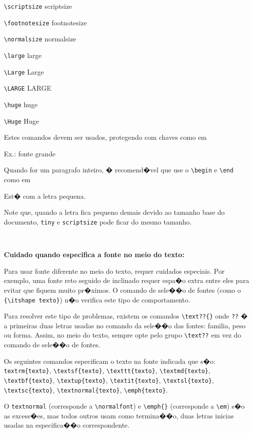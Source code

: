 \documentclass[12pt,a4paper]{article}
\begin{document}
\verb|\scriptsize| {\scriptsize scriptsize}

\verb|\footnotesize| {\footnotesize footnotesize}

\verb|\normalsize| {\normalsize normalsize}

\verb|\large| {\large large}

\verb|\Large| {\Large Large}

\verb|\LARGE| {\LARGE LARGE}

\verb|\huge| {\huge huge}

\verb|\Huge| {\Huge Huge}

Estes comandos devem ser usados, protegendo com chaves como em

Ex.: {\Large fonte grande}

Quando for um paragrafo inteiro, � recomend�vel que use o
\verb+\begin+ e \verb+\end+ como em

\begin{small}
    Est� com a letra pequena.
\end{small}

Note que, quando a letra fica pequeno demais devido ao tamanho base 
do documento, \texttt{tiny} e \texttt{scriptsize} pode 
ficar do mesmo tamanho.

\

{\bfseries Cuidado quando especifica a fonte no meio do texto:}

Para usar fonte diferente no meio do texto, requer cuidados especiais. 
Por exemplo, uma fonte reto seguido de inclinado requer espa�o extra entre 
eles para evitar que fiquem muito pr�ximos.
O comando de sele��o de fontes (como o \verb+{\itshape texto}+)
n�o verifica este tipo de comportamento.

Para resolver este tipo de problemas, existem os comandos \verb|\text??{}| 
onde \verb|??| � a primeiras duas letras usadas no comando da sele��o das 
fontes: familia, peso ou forma.
Assim, no meio do texto, sempre opte pelo grupo \verb+\text??+ em vez do comando de sele��o de fontes.

Os seguintes comandos especificam o texto na fonte indicada que s�o:
\verb|textrm{texto}|, \verb|\textsf{texto}|, \verb|\texttt{texto}|, \verb|\textmd{texto}|,
\verb|\textbf{texto}|, \verb|\textup{texto}|, \verb|\textit{texto}|, \verb|\textsl{texto}|,
\verb|\textsc{texto}|, \verb|\textnormal{texto}|, \verb|\emph{texto}|.

O \verb|textnormal| (corresponde a \verb|\normalfont|) e
 \verb|\emph{}| (corresponde a \verb|\em|) 
s�o as excess�es, mas todos outros usam como termina��o, 
duas letras inicias usadas na especifica��o correspondente.
\end{document}
